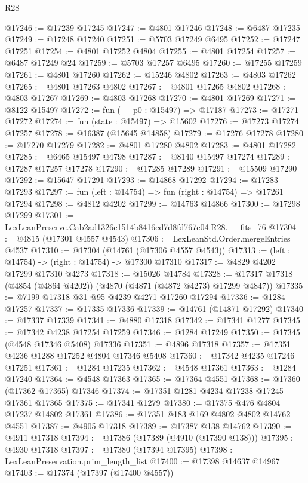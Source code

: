 \begin{lexlean}{R28}
\begin{coremodule}
@17246 := @17239 @17245
@17247 := @4801 @17246
@17248 := @6487 @17235
@17249 := @17248 @17240
@17251 := @5703 @17249 @6495
@17252 := @17247 @17251
@17254 := @4801 @17252 @4804
@17255 := @4801 @17254
@17257 := @6487 @17249 @24
@17259 := @5703 @17257 @6495
@17260 := @17255 @17259
@17261 := @4801 @17260
@17262 := @15246 @4802
@17263 := @4803 @17262
@17265 := @4801 @17263 @4802
@17267 := @4801 @17265 @4802
@17268 := @4803 @17267
@17269 := @4803 @17268
@17270 := @4801 @17269
@17271 := @8122 @15497
@17272 := fun (__p0 : @15497) => @17187
@17273 := @17271 @17272
@17274 := fun (state : @15497) => @15602
@17276 := @17273 @17274 @17257
@17278 := @16387 (@15645 @14858)
@17279 := @17276 @17278
@17280 := @17270 @17279
@17282 := @4801 @17280 @4802
@17283 := @4801 @17282
@17285 := @6465 @15497 @4798
@17287 := @8140 @15497 @17274
@17289 := @17287 @17257 @17278
@17290 := @17285 @17289
@17291 := @15509 @17290
@17292 := @15647 @17291
@17293 := @14868 @17292
@17294 := @17283 @17293
@17297 := fun (left : @14754) => fun (right : @14754) => @17261 @17294
@17298 := @4812 @4202
@17299 := @14763 @14866
@17300 := @17298 @17299
@17301 := LexLeanPreserve.Cab2ad1326c1514b8416cd7d8fd767c04.R28.__fits_76
@17304 := @4815 (@17301 @4557 @4543)
@17306 := LexLeanStd.Order.mergeEntries @4537
@17310 := @17304 (@14761 (@17306 @4557 @4543))
@17313 := (left : @14754) -> (right : @14754) -> @17300 @17310
@17317 := @4829 @4202 @17299 @17310 @4273
@17318 := @15026 @14784
@17328 := @17317 @17318 (@4854 (@4864 @4202)) (@4870 (@4871 (@4872 @4273) @17299 @4847))
@17335 := @7199 @17318 @31 @95 @4239 @4271 @17260 @17294
@17336 := @1284 @17257
@17337 := @17335 @17336
@17339 := @14761 (@14871 @17292)
@17340 := @17337 @17339
@17341 := @4880 @17318
@17342 := @17341 @1277
@17345 := @17342 @4238 @17254 @17259
@17346 := @1284 @17249
@17350 := @17345 (@4548 @17346 @5408) @17336
@17351 := @4896 @17318
@17357 := @17351 @4236 @1288 @17252 @4804 @17346 @5408
@17360 := @17342 @4235 @17246 @17251
@17361 := @1284 @17235
@17362 := @4548 @17361
@17363 := @1284 @17240
@17364 := @4548 @17363
@17365 := @17364 @4551
@17368 := @17360 (@17362 @17365) @17346
@17374 := @17351 @1281 @4234 @17238 @17245 @17361 @17365
@17375 := @17341 @1279
@17380 := @17375 @476 @4804 @17237 @14802 @17361
@17386 := @17351 @183 @169 @4802 @4802 @14762 @4551
@17387 := @4905 @17318
@17389 := @17387 @138 @14762
@17390 := @4911 @17318
@17394 := @17386 (@17389 (@4910 (@17390 @138)))
@17395 := @4930 @17318
@17397 := @17380 (@17394 @17395)
@17398 := LexLeanPreservation.prim_length_list
@17400 := @17398 @14637 @14967
@17403 := @17374 (@17397 (@17400 @4557))

\end{coremodule}
\end{lexlean}
